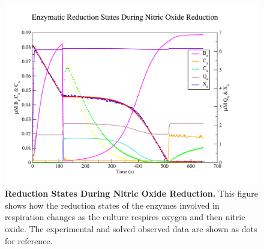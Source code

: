 \begin{figure}[tbp]
 \centering
 \includegraphics[width=15cm, trim=1cm 1cm 3cm 1cm, clip=true]{./06-noreduction/data/aer-no-sim-redox.pdf}
 \caption[{Reduction States During Nitric Oxide Reduction.}]{{\bf Reduction States During Nitric Oxide Reduction.} This figure shows how the reduction states of the enzymes involved in respiration changes as the culture respires oxygen and then nitric oxide. The experimental and solved observed data are shown as dots for reference.}
 \label{fig:nosimredox}
\end{figure}

